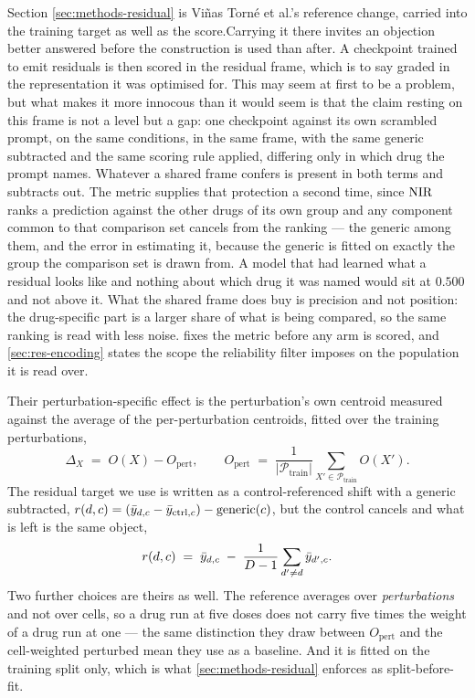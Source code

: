 Section \cref{sec:methods-residual} is Vi\~nas Torn\'e et al.'s reference change, carried
into the training target as well as the score.Carrying it there invites an objection better answered before the construction is
used than after. A checkpoint trained to emit residuals is then scored in the
residual frame, which is to say graded in the representation it was optimised
for. This may seem at first to be a problem, but what makes it more innocous than it would seem is that the claim resting on this frame is not a
level but a gap: one checkpoint against its own scrambled prompt, on the same
conditions, in the same frame, with the same generic subtracted and the same
scoring rule applied, differing only in which drug the prompt names. Whatever a
shared frame confers is present in both terms and subtracts out. The metric
supplies that protection a second time, since $\textrm{NIR}$ ranks a prediction against
the other drugs of its own group and any component common to that comparison set
cancels from the ranking --- the generic among them, and the error in estimating
it, because the generic is fitted on exactly the group the comparison set is
drawn from. A model that had learned what a residual looks like and nothing about
which drug it was named would sit at $0.500$ and not above it. What the shared
frame does buy is precision and not position: the drug-specific part is a larger
share of what is being compared, so the same ranking is read with less noise.
 fixes the metric before any arm is scored, and
\cref{sec:res-encoding} states the scope the reliability filter imposes on the
population it is read over.


Their perturbation-specific effect is
the perturbation's own centroid measured against the average of the
per-perturbation centroids, fitted over the training perturbations,
\begin{equation}
 \Delta_X \;=\; O(X) - O_{\textrm{pert}},
 \qquad
 O_{\textrm{pert}} \;=\; \frac{1}{|\mathcal{P}_{\textrm{train}}|}
   \sum_{X' \in \mathcal{P}_{\textrm{train}}} O(X') .
\end{equation}
The residual target we use is written as a control-referenced shift with a generic
subtracted, $r(d,c) = (\bar{y}_{d,c} - \bar{y}_{\textrm{ctrl},c}) -
\textrm{generic}(c)$, but the control cancels and what is left is the same
object,
\begin{equation}
 r(d,c) \;=\; \bar{y}_{d,c} \;-\; \frac{1}{D-1}\sum_{d' \neq d} \bar{y}_{d',c} .
\end{equation}
Two further choices are theirs as well. The reference averages over
\emph{perturbations} and not over cells, so a drug run at five doses does not
carry five times the weight of a drug run at one --- the same distinction they
draw between $O_{\textrm{pert}}$ and the cell-weighted perturbed mean they use as
a baseline. And it is fitted on the training split only, which is what
\cref{sec:methods-residual} enforces as split-before-fit.

